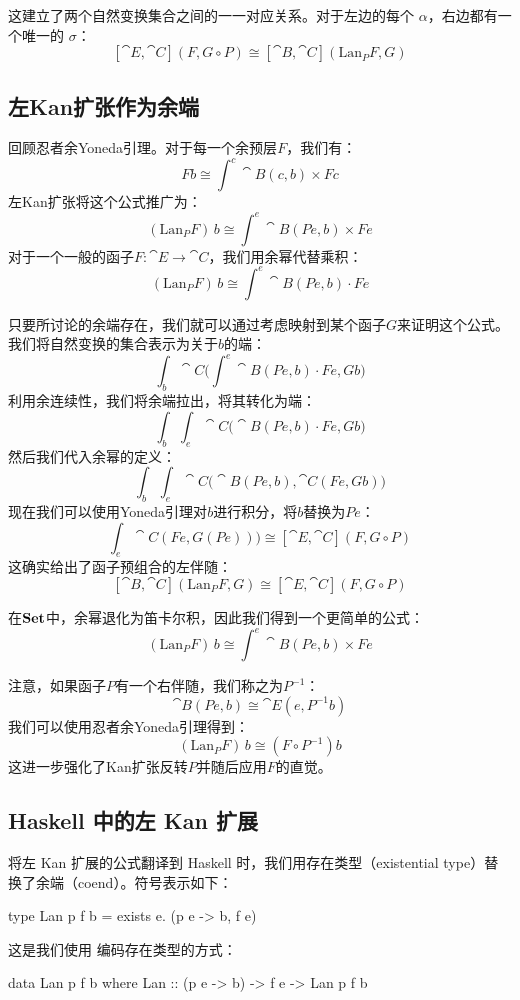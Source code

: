\documentclass[DaoFP]{subfiles}
\begin{document}
这建立了两个自然变换集合之间的一一对应关系。对于左边的每个 $\alpha$，右边都有一个唯一的 $\sigma$：
\[  [\cat E, \cat C] (F, G \circ P) \cong [\cat B, \cat C](\text{Lan}_P F , G)  \]

\subsection{左Kan扩张作为余端}

回顾忍者余Yoneda引理。对于每一个余预层$F$，我们有：
\[ F b \cong \int^{c} \cat B(c, b) \times F c \]
左Kan扩张将这个公式推广为：
\[ (\text{Lan}_P F)\, b \cong \int^{e} \cat B (P e, b) \times F e \]
对于一个一般的函子$F \colon \cat E \to \cat C$，我们用余幂代替乘积：
\[ (\text{Lan}_P F)\, b \cong \int^{e} \cat B(P e, b) \cdot F e \]

只要所讨论的余端存在，我们就可以通过考虑映射到某个函子$G$来证明这个公式。我们将自然变换的集合表示为关于$b$的端：
\[\int_b \cat C \big(\int^e \cat B(P e, b) \cdot F e, G b\big) \]
利用余连续性，我们将余端拉出，将其转化为端：
\[\int_b \int_e \cat C \big(\cat B(P e, b) \cdot F e, G b\big) \]
然后我们代入余幂的定义：
\[\int_b \int_e \cat C \big(\cat B(P e, b), \cat C (F e, G b)\big) \]
现在我们可以使用Yoneda引理对$b$进行积分，将$b$替换为$P e$：
\[\int_e \cat C (F e, G (P e))\big) \cong  [\cat E, \cat C] (F, G \circ P) \]
这确实给出了函子预组合的左伴随：
\[ [\cat B, \cat C](\text{Lan}_P F , G) \cong  [\cat E, \cat C] (F, G \circ P) \]

在$\mathbf{Set}$中，余幂退化为笛卡尔积，因此我们得到一个更简单的公式：
\[ (\text{Lan}_P F)\, b \cong \int^{e} \cat B (P e, b) \times F e \]

注意，如果函子$P$有一个右伴随，我们称之为$P^{-1}$：
\[ \cat B(P e , b) \cong \cat E(e, P^{-1} b) \]
我们可以使用忍者余Yoneda引理得到：
\[  (\text{Lan}_P F)\, b \cong (F \circ P^{-1}) b \]
这进一步强化了Kan扩张反转$P$并随后应用$F$的直觉。

\subsection{Haskell 中的左 Kan 扩展}

将左 Kan 扩展的公式翻译到 Haskell 时，我们用存在类型（existential type）替换了余端（coend）。符号表示如下：
\begin{haskell}
type Lan p f b = exists e. (p e -> b, f e)
\end{haskell}
这是我们使用  编码存在类型的方式：
\begin{haskell}
data Lan p f b where
    Lan :: (p e -> b) -> f e -> Lan p f b
\end{haskell}
\end{document}
